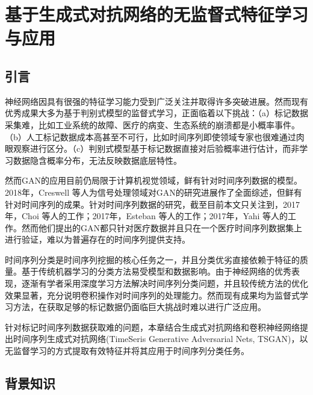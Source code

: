 
\chapter{基于生成式对抗网络的无监督式特征学习与应用}
\label{chap:gan}

\section{引言}

神经网络因具有很强的特征学习能力受到广泛关注并取得许多突破进展\cite{lecun2015deep,tsui2015prognostics}。然而现有优秀成果大多为基于判别式模型的监督式学习，正面临着以下挑战：（a）标记数据采集难，比如工业系统的故障、医疗的病变、生态系统的崩溃都是小概率事件。（b）人工标记数据成本高甚至不可行，比如时间序列即使领域专家也很难通过肉眼观察进行区分\cite{langkvist2014review}。（c）判别式模型基于标记数据直接对后验概率进行估计，而非学习数据隐含概率分布，无法反映数据底层特性。


然而GAN的应用目前仍局限于计算机视觉领域，鲜有针对时间序列数据的模型。2018年，Creswell 等人为信号处理领域对GAN的研究进展作了全面综述，但鲜有针对时间序列的成果\cite{creswell2018generative}。针对时间序列数据的研究，截至目前本文只关注到，2017年，Choi 等人的工作\cite{choi2017generating}；2017年，Esteban 等人的工作\cite{esteban2017real}；2017年，Yahi 等人的工作\cite{yahi2017generative}。然而他们提出的GAN都只针对医疗数据并且只在一个医疗时间序列数据集上进行验证，难以为普遍存在的时间序列提供支持。

时间序列分类是时间序列挖掘的核心任务之一，并且分类优劣直接依赖于特征的质量。基于传统机器学习的分类方法易受模型和数据影响\cite{bagnall2017great}。由于神经网络的优秀表现，逐渐有学者采用深度学习方法解决时间序列分类问题，并且较传统方法的优化效果显著\cite{cui2016multi,wang2017time}，充分说明卷积操作对时间序列的处理能力。然而现有成果均为监督式学习方法，在获取足够的标记数据仍面临巨大挑战时难以进行广泛应用。

针对标记时间序列数据获取难的问题，本章结合生成式对抗网络和卷积神经网络提出时间序列生成式对抗网络(TimeSeris Generative Adversarial Nets, TSGAN)，以无监督学习的方式提取有效特征并将其应用于时间序列分类任务。

\section{背景知识}

